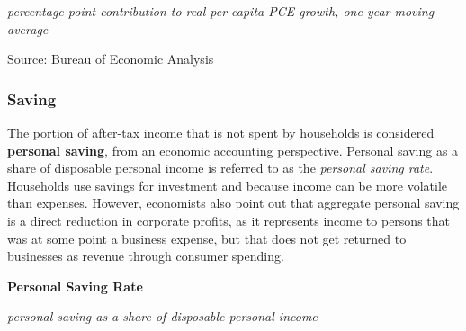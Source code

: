 \documentclass{report}
\makeatletter
\newcommand{\tbllink}[1]{\href{https://raw.githubusercontent.com/bdecon/US-chartbook/master/chartbook/data/#1}{\faTable}}
\newcommand*\short[1]{\expandafter\@gobbletwo\number\numexpr#1\relax}
\newcommand{\sbar}[4]{
		\addplot[ybar stacked, bar width=2.6pt, draw opacity=0, fill=#1] 
			table [x=#2, y=#3, col sep=comma]{#4};}
\newcommand{\dateaxisticks}{
		date coordinates in=x, axis line style={draw=none},
		xmax={2020-10-01},
		max space between ticks=40,	    
		xtick={{1990-01-01}, {1992-01-01}, {1994-01-01}, 
			{1996-01-01}, {1998-01-01}, {2000-01-01}, 
			{2002-01-01}, {2004-01-01}, {2006-01-01},
			{2008-01-01}, {2010-01-01}, {2012-01-01}, {2014-01-01},
		    {2016-01-01}, {2018-01-01}, {2020-01-01}},
		minor xtick={{1989-01-01}, {1991-01-01}, {1993-01-01},
			{1995-01-01}, {1997-01-01}, {1999-01-01}, 
			{2001-01-01}, {2003-01-01}, {2005-01-01}, {2007-01-01},
		    {2009-01-01}, {2011-01-01}, {2013-01-01}, {2015-01-01},
		    {2017-01-01}, {2019-01-01}},
		enlarge y limits={0.06}, enlarge x limits={0.01},
		}
\newcommand{\bbar}[2]{extra #1 ticks = {{#2}}, extra #1 tick labels = ,
		extra #1 tick style = {grid=major, grid style={thick, black!25}},}
\newcommand{\stdline}[4]{\addplot[very thick, no markers, color=#1] 
		table [x=#2, y=#3, col sep=comma] {#4};	}
\newcommand{\rbars}{
		\fill[color=black!10] (axis cs:{1990-07-01},\pgfkeysvalueof{/pgfplots/ymin}) rectangle 
			(axis cs:{1991-03-01}, \pgfkeysvalueof{/pgfplots/ymax});
		\fill[color=black!10] (axis cs:{2007-12-01},\pgfkeysvalueof{/pgfplots/ymin}) rectangle 
			(axis cs:{2009-07-01}, \pgfkeysvalueof{/pgfplots/ymax});
		\fill[color=black!10] (axis cs:{2001-03-01},\pgfkeysvalueof{/pgfplots/ymin}) rectangle 
			(axis cs:{2001-11-01}, \pgfkeysvalueof{/pgfplots/ymax});
		\fill[color=black!10] (axis cs:{2020-02-01},\pgfkeysvalueof{/pgfplots/ymin}) rectangle 
			(axis cs:{2020-10-01}, \pgfkeysvalueof{/pgfplots/ymax});}
\makeatother
\begin{document}
{{{\begin{minipage}{0.76\textwidth}
\footnotesize{\textit{percentage point contribution to real per capita PCE growth, one-year moving average}}

\hspace*{-2mm} 

\footnotesize{Source: Bureau of Economic Analysis} \hfill \tbllink{pcedecomp.csv}

\end{minipage}

\newpage


\begin{minipage}{0.76\textwidth}

\subsubsection*{\color{black!70} \seriffont Saving}

\small The portion of after-tax income that is not spent by households is considered \textbf{\href{https://www.bea.gov/index.php/help/glossary/personal-saving}{personal saving}}, from an economic accounting perspective. Personal saving as a share of disposable personal income is referred to as the \textit{personal saving rate}. Households use savings for investment and because income can be more volatile than expenses. However, economists also point out that aggregate personal saving is a direct reduction in corporate profits, as it represents income to persons that was at some point a business expense, but that does not get returned to businesses as revenue through consumer spending. \\



\vspace{4mm}

\normalsize \textbf{Personal Saving Rate}

\footnotesize{\textit{personal saving as a share of disposable personal income}}


\end{minipage}}}}
\end{document}

